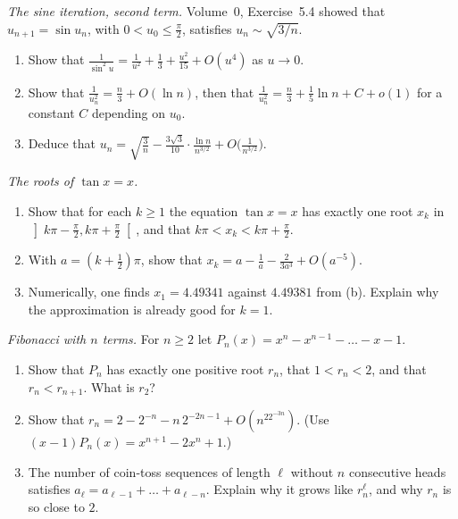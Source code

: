 \begin{exercise}[$\star\star\star$]\label{pb:sinesecond}
\emph{The sine iteration, second term.} Volume~0, Exercise~5.4 showed that $u_{n+1}=\sin u_n$, with $0<u_0\le\frac\pi2$, satisfies $u_n\sim\sqrt{3/n}$.
\begin{enumerate}[label=(\alph*)]
\item Show that $\frac1{\sin^2u}=\frac1{u^2}+\frac13+\frac{u^2}{15}+O(u^4)$ as $u\to0$.
\item Show that $\frac1{u_n^2}=\frac n3+O(\ln n)$, then that $\frac1{u_n^2}=\frac n3+\frac15\ln n+C+o(1)$ for a constant $C$ depending on $u_0$.
\item Deduce that $u_n=\sqrt{\frac3n}-\frac{3\sqrt3}{10}\cdot\frac{\ln n}{n^{3/2}}+O\bigl(\frac1{n^{3/2}}\bigr)$.
\end{enumerate}
\end{exercise}

\begin{exercise}[$\star$]\label{pb:tanroots}
\emph{The roots of $\tan x=x$.}
\begin{enumerate}[label=(\alph*)]
\item Show that for each $k\ge1$ the equation $\tan x=x$ has exactly one root $x_k$ in $\left]k\pi-\frac\pi2,k\pi+\frac\pi2\right[$, and that $k\pi<x_k<k\pi+\frac\pi2$.
\item With $a=(k+\frac12)\pi$, show that $x_k=a-\frac1a-\frac2{3a^3}+O(a^{-5})$.
\item Numerically, one finds $x_1=4.49341$ against $4.49381$ from (b). Explain why the approximation is already good for $k=1$.
\end{enumerate}
\end{exercise}

\begin{exercise}[$\star\star$]\label{pb:nbonacci}
\emph{Fibonacci with $n$ terms.} For $n\ge2$ let $P_n(x)=x^n-x^{n-1}-\dots-x-1$.
\begin{enumerate}[label=(\alph*)]
\item Show that $P_n$ has exactly one positive root $r_n$, that $1<r_n<2$, and that $r_n<r_{n+1}$. What is $r_2$?
\item Show that $r_n=2-2^{-n}-n\,2^{-2n-1}+O(n^22^{-3n})$. (Use $(x-1)P_n(x)=x^{n+1}-2x^n+1$.)
\item The number of coin-toss sequences of length $\ell$ without $n$ consecutive heads satisfies $a_\ell=a_{\ell-1}+\dots+a_{\ell-n}$. Explain why it grows like
$r_n^\ell$, and why $r_n$ is so close to $2$.
\end{enumerate}
\end{exercise}

